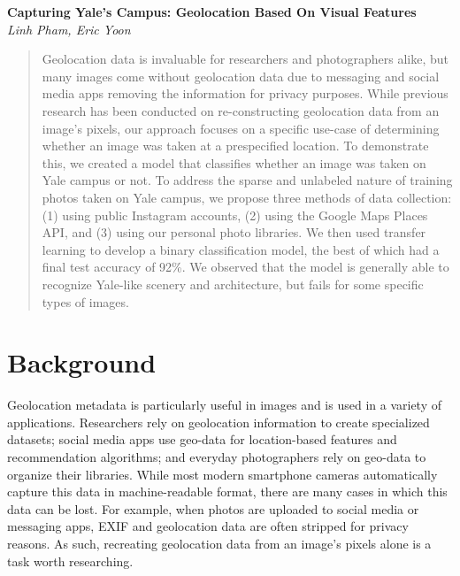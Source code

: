 \documentclass[letterpaper]{article} %
\begin{document}
\begin{titlepage}
   \begin{center}
      \Large\textbf{Capturing Yale’s Campus: Geolocation Based On Visual Features}\\
      \large\textit{Linh Pham, Eric Yoon}
   \end{center}
\end{titlepage}

\begin{abstract}
Geolocation data is invaluable for researchers and photographers alike, but many images come without geolocation data due to messaging and social media apps removing the information for privacy purposes. While previous research has been conducted on re-constructing geolocation data from an image’s pixels, our approach focuses on a specific use-case of determining whether an image was taken at a prespecified location. To demonstrate this, we created a model that classifies whether an image was taken on Yale campus or not. To address the sparse and unlabeled nature of training photos taken on Yale campus, we propose three methods of data collection: (1) using public Instagram accounts, (2) using the Google Maps Places API, and (3) using our personal photo libraries. We then used transfer learning to develop a binary classification model, the best of which had a final test accuracy of 92\%. We observed that the model is generally able to recognize Yale-like scenery and architecture, but fails for some specific types of images.
\end{abstract}

\section{Background}
Geolocation metadata is particularly useful in images and is used in a variety of applications. Researchers rely on geolocation information to create specialized datasets; social media apps use geo-data for location-based features and recommendation algorithms; and everyday photographers rely on geo-data to organize their libraries. While most modern smartphone cameras automatically capture this data in machine-readable format, there are many cases in which this data can be lost. For example, when photos are uploaded to social media or messaging apps, EXIF and geolocation data are often stripped for privacy reasons. As such, recreating geolocation data from an image’s pixels alone is a task worth researching.
\end{document}

